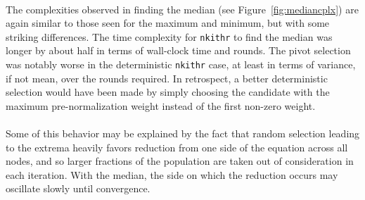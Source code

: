 \documentclass[11pt,epsf]{article}
\begin{document}
{{    \paragraph{}{
      The complexities observed in finding the median (see Figure~\ref{fig:mediancplx})
      are again similar to those seen for the maximum and minimum, but with some striking
      differences. The time complexity for \texttt{nkithr} to find the median
      was longer by about half in terms of wall-clock time and rounds.
      The pivot selection was notably worse in the deterministic \texttt{nkithr}
      case, at least in terms of variance, if not mean, over the rounds required.
      In retrospect, a better deterministic selection would have been made
      by simply choosing the candidate with the maximum pre-normalization weight
      instead of the first non-zero weight.
    }
    \paragraph{}{
      Some of this behavior may be explained by the fact that random selection
      leading to the extrema heavily favors reduction from one side of the
      equation across all nodes, and so larger fractions of the population
      are taken out of consideration in each iteration. With the median,
      the side on which the reduction occurs may oscillate slowly until
      convergence.
    }
  }
}
\end{document}
